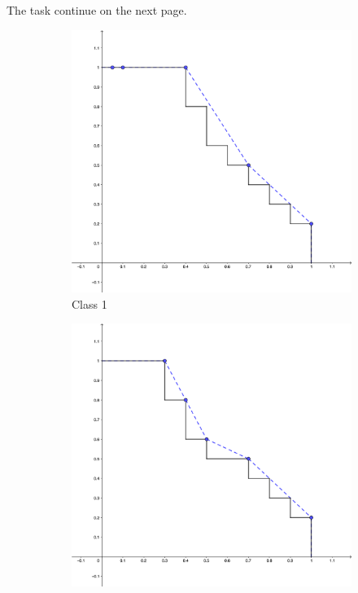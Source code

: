 The task continue on the next page.

\clearpage

\begin{figure}[h!]
    \centering
    \begin{subfigure}[b]{0.24\textwidth}
        \centering
        \includegraphics[width=\textwidth]{Images/task1c1.png}
        \caption*{Class 1}
    \end{subfigure}
    \hfill
    \begin{subfigure}[b]{0.24\textwidth}
        \centering
        \includegraphics[width=\textwidth]{Images/task1c2.png}

\end{subfigure}
\end{figure}
